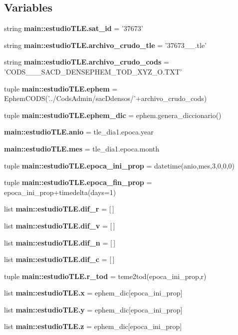 \subsection*{\-Variables}
\begin{DoxyCompactItemize}
\item 
string {\bf main\-::estudio\-T\-L\-E.\-sat\-\_\-id} = '37673'
\item 
string {\bf main\-::estudio\-T\-L\-E.\-archivo\-\_\-crudo\-\_\-tle} = '37673\-\_\-\_.\-tle'
\item 
string {\bf main\-::estudio\-T\-L\-E.\-archivo\-\_\-crudo\-\_\-cods} = '\-C\-O\-D\-S\-\_\-\_\-\_\-\-S\-A\-C\-D\-\_\-\-D\-E\-N\-S\-E\-P\-H\-E\-M\-\_\-\-T\-O\-D\-\_\-\-X\-Y\-Z\-\_\-\-O.\-T\-X\-T'
\item 
tuple {\bf main\-::estudio\-T\-L\-E.\-ephem} = \-Ephem\-C\-O\-D\-S('../\-Cods\-Admin/sac\-Ddensos/'+archivo\-\_\-crudo\-\_\-cods)
\item 
tuple {\bf main\-::estudio\-T\-L\-E.\-ephem\-\_\-dic} = ephem.\-genera\-\_\-diccionario()
\item 
{\bf main\-::estudio\-T\-L\-E.\-anio} = tle\-\_\-dia1.\-epoca.\-year
\item 
{\bf main\-::estudio\-T\-L\-E.\-mes} = tle\-\_\-dia1.\-epoca.\-month
\item 
tuple {\bf main\-::estudio\-T\-L\-E.\-epoca\-\_\-ini\-\_\-prop} = datetime(anio,mes,3,0,0,0)
\item 
tuple {\bf main\-::estudio\-T\-L\-E.\-epoca\-\_\-fin\-\_\-prop} = epoca\-\_\-ini\-\_\-prop+timedelta(days=1)
\item 
list {\bf main\-::estudio\-T\-L\-E.\-dif\-\_\-r} = [$\,$]
\item 
list {\bf main\-::estudio\-T\-L\-E.\-dif\-\_\-v} = [$\,$]
\item 
list {\bf main\-::estudio\-T\-L\-E.\-dif\-\_\-n} = [$\,$]
\item 
list {\bf main\-::estudio\-T\-L\-E.\-dif\-\_\-c} = [$\,$]
\item 
tuple {\bf main\-::estudio\-T\-L\-E.\-r\-\_\-tod} = teme2tod(epoca\-\_\-ini\-\_\-prop,r)
\item 
list {\bf main\-::estudio\-T\-L\-E.\-x} = ephem\-\_\-dic[epoca\-\_\-ini\-\_\-prop]
\item 
list {\bf main\-::estudio\-T\-L\-E.\-y} = ephem\-\_\-dic[epoca\-\_\-ini\-\_\-prop]
\item 
list {\bf main\-::estudio\-T\-L\-E.\-z} = ephem\-\_\-dic[epoca\-\_\-ini\-\_\-prop]
\item 

\end{DoxyCompactItemize}
